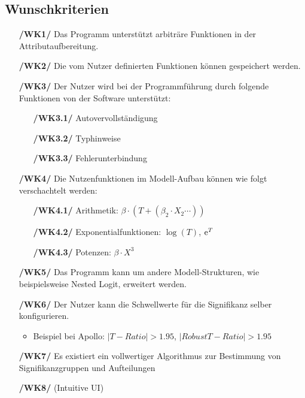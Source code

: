 \documentclass{article}
\begin{document}
\subsection{Wunschkriterien}
\begin{itemize}
    \item[\textbf{/WK1/}] Das Programm unterstützt arbiträre Funktionen in der Attributaufbereitung.
    \item[\textbf{/WK2/}] Die vom Nutzer definierten Funktionen können gespeichert werden.
    \item[\textbf{/WK3/}] Der Nutzer wird bei der Programmführung durch folgende Funktionen von der Software unterstützt:
    \begin{itemize}[leftmargin=.7in]
        \item[\textbf{/WK3.1/}] Autovervollständigung
        \item[\textbf{/WK3.2/}] Typhinweise
        \item[\textbf{/WK3.3/}] Fehlerunterbindung
    \end{itemize}
    \item[\textbf{/WK4/}] Die Nutzenfunktionen im Modell-Aufbau können wie folgt verschachtelt werden:
    \begin{itemize}[leftmargin=.7in]
        \item[\textbf{/WK4.1/}] Arithmetik: $\beta \cdot (T + (\beta_2 \cdot X_2 \cdots))$
        \item[\textbf{/WK4.2/}] Exponentialfunktionen: $\log(T)$, ${\rm e}^T$
        \item[\textbf{/WK4.3/}] Potenzen: $\beta \cdot X^3$
    \end{itemize}
    \item[\textbf{/WK5/}] Das Programm kann um andere Modell-Strukturen, wie beispielsweise Nested Logit, erweitert werden.
    \item[\textbf{/WK6/}] Der Nutzer kann die Schwellwerte für die Signifikanz selber konfigurieren.
    \begin{itemize}
        \item Beispiel bei Apollo: $|T-Ratio | > 1.95$, $|Robust T-Ratio | > 1.95$
    \end{itemize}    
    \item[\textbf{/WK7/}] Es existiert ein vollwertiger Algorithmus zur Bestimmung von Signifikanzgruppen und Aufteilungen
    \item[\textbf{/WK8/}] (Intuitive UI)
    
\end{itemize}
\end{document}
